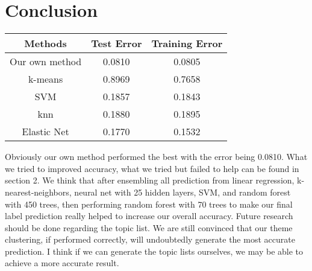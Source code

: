 \documentclass[english]{article}
\begin{document}
\section{Conclusion}
    \begin{center}
      \begin{tabular}{|c |c |c|}
      \hline
      Methods & Test Error&Training Error\\ [1ex]
      \hline
      Our own method   &      0.0810& 0.0805\\[1ex]
      \hline
      k-means     &   0.8969& 0.7658\\[1ex]
      \hline
      SVM   &      0.1857&0.1843\\[1ex]
      \hline
      knn     &   0.1880&0.1895\\[1ex]
      \hline
      Elastic Net   &   0.1770&0.1532\\[1ex]
      \hline
      \end{tabular}
    \end{center}
Obviously our own method performed the best with the error being 0.0810. What we tried to improved accuracy, what we tried but failed to help can be found in section 2. We think that after ensembling all prediction from linear regression, k-nearest-neighbors, neural net with 25 hidden layers, SVM, and random forest with 450 trees, then performing random forest with 70 trees to make our final label prediction really helped to increase our overall accuracy. Future research should be done regarding the topic list. We are still convinced that our theme clustering, if performed correctly, will undoubtedly generate the most accurate prediction. I think if we can generate the topic lists ourselves, we may be able to achieve a more accurate result.\\\\
\end{document}
